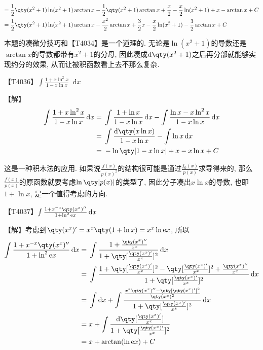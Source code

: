\documentclass{ctexbook}
\newcommand{\e}{\mathrm{e}}
\newcommand*{\dif}{\mathop{}\!\mathrm{d}}
\begin{document}
{\begin{align*}
={}&\frac{1}{2}\qty(x^{2}+1)\ln(x^{2}+1)\arctan{x}-\frac{1}{2}\qty(x^{2}+1)\arctan{x}+\frac{x}{2}-\frac{x}{2}\ln(x^{2}+1)+x-\arctan{x}+C\\
={}&\frac{1}{2}\qty(x^{2}+1)\ln(x^{2}+1)\arctan{x}-\frac{x^{2}}{2}\arctan{x}+\frac{3}{2}x-\frac{x}{2}\ln(x^{2}+1)-\frac{3}{2}\arctan{x}+C
\end{align*}\par
{\kaishu 本题的凑微分技巧和【T4034】是一个道理的. 无论是$\ln(x^{2}+1)$的导数还是$\arctan{x}$的导数都带有$x^{2}+1$的分母, 因此凑成$\dif{\qty(x^{2}+1)}$之后再分部就能够实现约分的效果, 从而让被积函数看上去不那么复杂. \par}
【T4036】$\int\frac{1+x\ln^{2}{x}}{1-x\ln{x}}\dif{x}$\par
【解】
\begin{align*}
\int\frac{1+x\ln^{2}{x}}{1-x\ln{x}}\dif{x}={}&\int\frac{1+\ln{x}}{1-x\ln{x}}\dif{x}-\int\frac{\ln{x}-x\ln^{2}{x}}{1-x\ln{x}}\dif{x}\\
={}&\int\frac{\dif{\qty(x\ln{x})}}{1-x\ln{x}}-\int\ln{x}\dif{x}\\
={}&-\ln\qty|1-x\ln{x}|+x-x\ln{x}+C
\end{align*}\par
{\kaishu 这是一种积木法的应用. 如果说$\frac{f(x)}{p(x)^{2}}$的结构很可能是通过$\frac{f_{0}(x)}{p(x)}$求导得来的, 那么$\frac{f(x)}{p(x)}$的原函数就要考虑$\ln\qty|p(x)|$的类型了, 因此分子凑出$x\ln{x}$的导数, 也即$1+\ln{x}$, 是一个值得考虑的方向. \par}
【T4037】$\int\frac{1+x^{-x}\qty(x^{x})''}{1+\ln^{2}{\e x}}\dif{x}$\par
【解】考虑到$\qty(x^{x})'=x^{x}\qty(1+\ln{x})=x^{x}\ln{\e x}$, 所以
\begin{align*}
\int\frac{1+x^{-x}\qty(x^{x})''}{1+\ln^{2}{\e x}}\dif{x}={}&\int\frac{1+\frac{\qty(x^{x})''}{x^{x}}}{1+\qty[\frac{\qty(x^{x})'}{x^{x}}]^{2}}\dif{x}\\
={}&\int\frac{1+\qty[\frac{\qty(x^{x})'}{x^{x}}]^{2}-\qty[\frac{\qty(x^{x})'}{x^{x}}]^{2}+\frac{\qty(x^{x})''}{x^{x}}}{1+\qty[\frac{\qty(x^{x})'}{x^{x}}]^{2}}\dif{x}\\
={}&\int\dif{x}+\int\frac{\frac{x^{x}\qty(x^{x})''-\qty[\qty(x^{x})']^{2}}{\qty(x^{x})^{2}}}{1+\qty[\frac{\qty(x^{x})'}{x^{x}}]^{2}}\dif{x}\\
={}&x+\int\frac{\dif{\qty[\frac{\qty(x^{x})'}{x^{x}}]}}{1+\qty[\frac{\qty(x^{x})'}{x^{x}}]^{2}}\\
={}&x+\arctan(\ln{\e x})+C
\end{align*}\par
}
\end{document}
